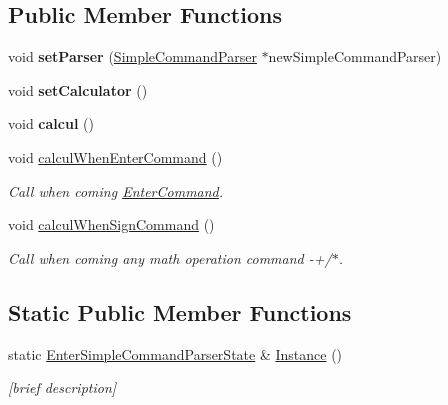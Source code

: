 \subsection*{Public Member Functions}
\begin{DoxyCompactItemize}
\item 
\hypertarget{class_enter_simple_command_parser_state_a13546695e08d0b59d2e345e589021a61}{}void {\bfseries set\+Parser} (\hyperlink{class_simple_command_parser}{Simple\+Command\+Parser} $\ast$new\+Simple\+Command\+Parser)\label{class_enter_simple_command_parser_state_a13546695e08d0b59d2e345e589021a61}

\item 
\hypertarget{class_enter_simple_command_parser_state_a67e7a4fb435920dac46b5f63525fba03}{}void {\bfseries set\+Calculator} ()\label{class_enter_simple_command_parser_state_a67e7a4fb435920dac46b5f63525fba03}

\item 
\hypertarget{class_enter_simple_command_parser_state_ae100ad32c058ef37df250ec8ec9d028c}{}void {\bfseries calcul} ()\label{class_enter_simple_command_parser_state_ae100ad32c058ef37df250ec8ec9d028c}

\item 
\hypertarget{class_enter_simple_command_parser_state_a9211b019344ae16aad0de205e4e35ab4}{}void \hyperlink{class_enter_simple_command_parser_state_a9211b019344ae16aad0de205e4e35ab4}{calcul\+When\+Enter\+Command} ()\label{class_enter_simple_command_parser_state_a9211b019344ae16aad0de205e4e35ab4}

\begin{DoxyCompactList}\small\item\em Call when coming \hyperlink{class_enter_command}{Enter\+Command}. \end{DoxyCompactList}\item 
\hypertarget{class_enter_simple_command_parser_state_a34bd436107b22fdc37f6f522f23d0401}{}void \hyperlink{class_enter_simple_command_parser_state_a34bd436107b22fdc37f6f522f23d0401}{calcul\+When\+Sign\+Command} ()\label{class_enter_simple_command_parser_state_a34bd436107b22fdc37f6f522f23d0401}

\begin{DoxyCompactList}\small\item\em Call when coming any math operation command -\/+/$\ast$. \end{DoxyCompactList}\end{DoxyCompactItemize}
\subsection*{Static Public Member Functions}
\begin{DoxyCompactItemize}
\item 
static \hyperlink{class_enter_simple_command_parser_state}{Enter\+Simple\+Command\+Parser\+State} \& \hyperlink{class_enter_simple_command_parser_state_ab3461599dfdee419e5aa53b9a4ea7611}{Instance} ()
\begin{DoxyCompactList}\small\item\em \mbox{[}brief description\mbox{]} \end{DoxyCompactList}\end{DoxyCompactItemize}

